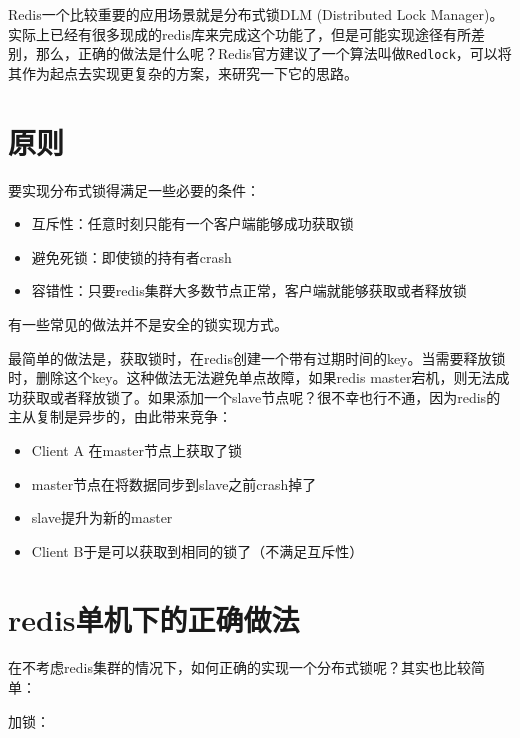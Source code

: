 \documentclass[12pt]{article}
\begin{document}
\makeblogtitle

Redis一个比较重要的应用场景就是分布式锁DLM (Distributed Lock Manager)。实际上已经有很多现成的redis库来完成这个功能了，但是可能实现途径有所差别，那么，正确的做法是什么呢？Redis官方建议了一个算法叫做\texttt{Redlock}，可以将其作为起点去实现更复杂的方案，来研究一下它的思路。

\section{原则}\label{ux539fux5219}

要实现分布式锁得满足一些必要的条件：

\begin{itemize}
\tightlist
\item
  互斥性：任意时刻只能有一个客户端能够成功获取锁
\item
  避免死锁：即使锁的持有者crash
\item
  容错性：只要redis集群大多数节点正常，客户端就能够获取或者释放锁
\end{itemize}

有一些常见的做法并不是安全的锁实现方式。

最简单的做法是，获取锁时，在redis创建一个带有过期时间的key。当需要释放锁时，删除这个key。这种做法无法避免单点故障，如果redis master宕机，则无法成功获取或者释放锁了。如果添加一个slave节点呢？很不幸也行不通，因为redis的主从复制是异步的，由此带来竞争：

\begin{itemize}
\tightlist
\item
  Client A 在master节点上获取了锁
\item
  master节点在将数据同步到slave之前crash掉了
\item
  slave提升为新的master
\item
  Client B于是可以获取到相同的锁了（不满足互斥性）
\end{itemize}

\section{redis单机下的正确做法}\label{redisux5355ux673aux4e0bux7684ux6b63ux786eux505aux6cd5}

在不考虑redis集群的情况下，如何正确的实现一个分布式锁呢？其实也比较简单：

加锁：

\begin{Shaded}
\begin{Highlighting}[]
\end{Highlighting}
\end{Shaded}
\end{document}
